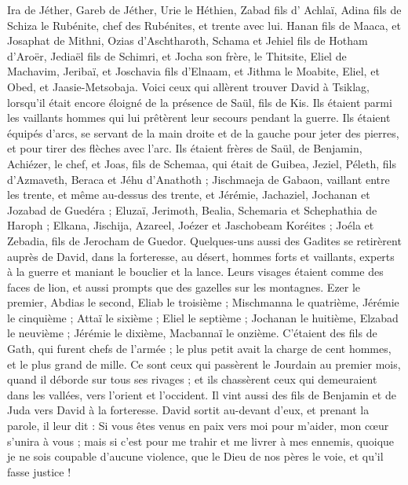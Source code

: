 \begin{multicols}{2}
Ira de Jéther, Gareb de Jéther,
Urie le Héthien, Zabad fils d' Achlaï,
Adina fils de Schiza le Rubénite, chef des Rubénites, et trente avec lui.
Hanan fils de Maaca, et Josaphat de Mithni,
Ozias d'Aschtharoth, Schama et Jehiel fils de Hotham d'Aroër,
Jediaël fils de Schimri, et Jocha son frère, le Thitsite,
Eliel de Machavim, Jeribaï, et Joschavia fils d'Elnaam, et Jithma le Moabite,
Eliel, et Obed, et Jaasie-Metsobaja.
\VerseOne{}Voici ceux qui allèrent trouver David à Tsiklag, lorsqu'il était encore éloigné de la présence de Saül, fils de Kis. Ils étaient parmi les vaillants hommes qui lui prêtèrent leur secours pendant la guerre.
Ils étaient équipés d'arcs, se servant de la main droite et de la gauche pour jeter des pierres, et pour tirer des flèches avec l'arc. Ils étaient frères de Saül, de Benjamin,
Achiézer, le chef, et Joas, fils de Schemaa, qui était de Guibea, Jeziel, Péleth, fils d'Azmaveth, Beraca et Jéhu d'Anathoth ;
Jischmaeja de Gabaon, vaillant entre les trente, et même au-dessus des trente, et Jérémie, Jachaziel, Jochanan et Jozabad de Guedéra ;
Eluzaï, Jerimoth, Bealia, Schemaria et Schephathia de Haroph ;
Elkana, Jischija, Azareel, Joézer et Jaschobeam Koréites ;
Joéla et Zebadia, fils de Jerocham de Guedor.
Quelques-uns aussi des Gadites se retirèrent auprès de David, dans la forteresse, au désert, hommes forts et vaillants, experts à la guerre et maniant le bouclier et la lance. Leurs visages étaient comme des faces de lion, et aussi prompts que des gazelles sur les montagnes.
Ezer le premier, Abdias le second, Eliab le troisième ;
Mischmanna le quatrième, Jérémie le cinquième ;
Attaï le sixième ; Eliel le septième ;
Jochanan le huitième, Elzabad le neuvième ;
Jérémie le dixième, Macbannaï le onzième.
C’étaient des fils de Gath, qui furent chefs de l'armée ; le plus petit avait la charge de cent hommes, et le plus grand de mille.
Ce sont ceux qui passèrent le Jourdain au premier mois, quand il déborde sur tous ses rivages ; et ils chassèrent ceux qui demeuraient dans les vallées, vers l'orient et l'occident.
Il vint aussi des fils de Benjamin et de Juda vers David à la forteresse.
David sortit au-devant d'eux, et prenant la parole, il leur dit : Si vous êtes venus en paix vers moi pour m'aider, mon cœur s’unira à vous ; mais si c'est pour me trahir et me livrer à mes ennemis, quoique je ne sois coupable d'aucune violence, que le Dieu de nos pères le voie, et qu'il fasse justice !

\end{multicols}
